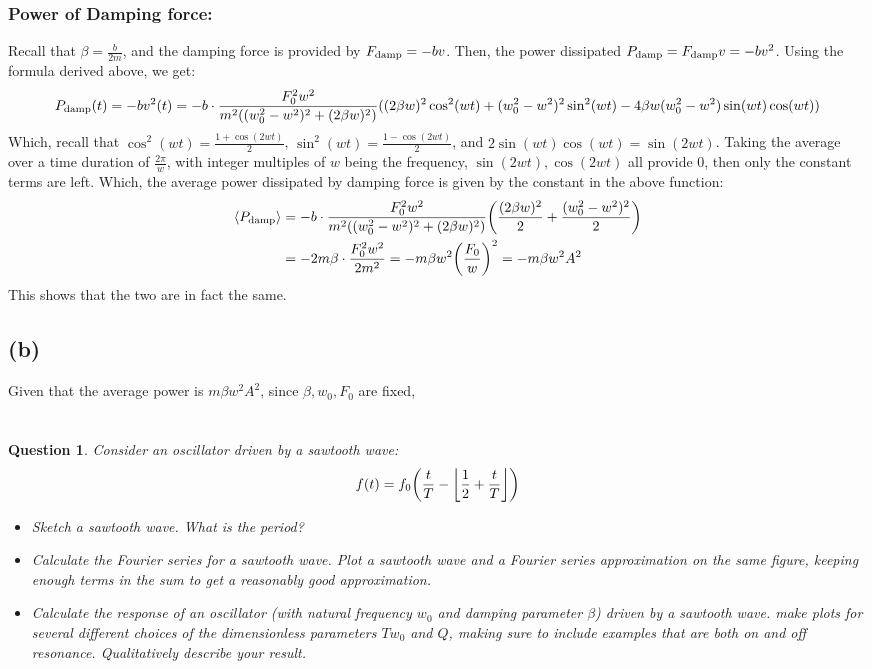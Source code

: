\documentclass{article}
\newtheorem{question}{Question}
\DeclarePairedDelimiter{\paran}{(}{)}%
\DeclarePairedDelimiter{\bracket}{\langle}{\rangle}
\begin{document}
\subsubsection*{Power of Damping force:}
Recall that $\beta=\frac{b}{2m}$, and the damping force is provided by $F_{\textmd{damp}} = -bv$. Then, the power dissipated $P_{\textmd{damp}}=F_{\textmd{damp}}v = -bv^2$. Using the formula derived above, we get:
\begin{equation}
    P_{\textmd{damp}}(t)=-bv^2(t) = -b\cdot \frac{F_0^2w^2}{m^2((w_0^2-w^2)^2+(2\beta w)^2)}((2\beta w)^2\cos^2(wt)+(w_0^2-w^2)^2\sin^2(wt)-4\beta w(w_0^2-w^2)\sin(wt)\cos(wt))
\end{equation}
Which, recall that $\cos^2(wt)=\frac{1+\cos(2wt)}{2}$, $\sin^2(wt)=\frac{1-\cos(2wt)}{2}$, and $2\sin(wt)\cos(wt)=\sin(2wt)$. Taking the average over a time duration of $\frac{2\pi}{w}$, with integer multiples of $w$ being the frequency, $\sin(2wt),\cos(2wt)$ all provide $0$, then only the constant terms are left. Which, the average power dissipated by damping force is given by the constant in the above function:
\begin{align}
    \bracket*{P_\textmd{damp}} &= -b\cdot\frac{F_0^2w^2}{m^2((w_0^2-w^2)^2+(2\beta w)^2)}\paran*{\frac{(2\beta w)^2}{2}+\frac{(w_0^2-w^2)^2}{2}}\\
    &= -2m\beta\cdot \frac{F_0^2w^2}{2m^2} = -m\beta w^2\paran*{\frac{F_0}{w}}^2 = -m\beta w^2A^2
\end{align}
This shows that the two are in fact the same.


\subsection*{(b)}
Given that the average power is $m\beta w^2A^2$, since $\beta, w_0, F_0$ are fixed, 

\break


\section{}
\begin{question}\label{q4}
    Consider an oscillator driven by a sawtooth wave:
    $$f(t)=f_0\paran*{\frac{t}{T}-\left\lfloor\frac{1}{2}+\frac{t}{T}\right\rfloor}$$
    \begin{itemize}
        \item[(a)] Sketch a sawtooth wave. What is the period?
        \item[(b)] Calculate the Fourier series for a sawtooth wave. Plot a sawtooth wave and a Fourier series approximation on the same figure, keeping enough terms in the sum to get a reasonably good approximation.
        \item[(c)] Calculate the response of an oscillator (with natural frequency $w_0$ and damping parameter $\beta$) driven by a sawtooth wave. make plots for several different choices of the dimensionless parameters $Tw_0$ and $Q$, making sure to include examples that are both on and off resonance. Qualitatively describe your result.
    \end{itemize}
\end{question}
\end{document}
